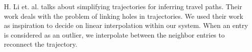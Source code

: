 H. Li et. al. talks about simplifying trajectories for inferring travel paths. Their work deals with the problem of linking holes in trajectories. We used their work as inspiration to decide on linear interpolation within our system. When an entry is considered as an outlier, we interpolate between the neighbor entries to reconnect the trajectory.

\begin{comment}
RELATED WORK
another article underbuildning PAYD because it says it reduces influence on the community
\cite{art:vehicfeacosben}

Looks at different pricing methods
Mainly look at usage in terms of distance driven.
\cite{art:PAYDVehInsur}

talks about descreasing premium cost for users who dont drive that far each year
\cite{art:PAYDafford}

justification and effects of PAYD on equity and lowering harms
\cite{art:PAYDredharms}

Generelt snak om UBI på et konceptuelt plan
\cite{art:telematicsmatter}
\cite{mar:telematics12}
\cite{mar:ubi13}
\cite{mar:ubi16}


The most similar research compared to what we did. They talk about a bundle of metrics, not completely similar to ours, because they also consider available spatial data. They also talk about launching UBI from a smartphone and the stability issues regarding this way of logging. A comparison of signal coverage/available is also presented.
Insurance Telematics - Opportunities and challenges with the smartphone solution
\cite{art:insurtelematics}



Road vehicle traffic probing done through smartphone, funded through facilitating UBI, what metrics to use but not a calculation or storage
acceleration, braking, smoothness, cornering, swerving, and speeding.
Smartphone-based measurement system
\cite{art:smartphonemonitor}

PriPAYD: Privacy-Friendly
Pay-As-You-Drive Insurance
local "in-box" calculations, aggregated data sent to the insurance company
provides a list of PAYD implementations
focus on how to secure the data in the box, not how to store and price
\cite{art:PriPAYDprivacy}


Talks about modeling temporal data within an ER diagram.
(propose time-varying, but also the basic case which we use)
CONCEPTUAL MODELLINGof time-varying information
\cite{art:modeltimevary}

We use this article to decide on linear interpolation
Spatio-Temporal Trajectory Simplification for Inferring Travel Paths
\cite{art:inftravelpath}

\end{comment}